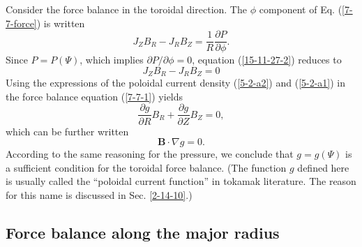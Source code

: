 \documentclass{llncs}
\begin{document}
Consider the force balance in the toroidal direction. The $\phi$ component of
Eq. (\ref{7-7-force}) is written
\begin{equation}
  \label{15-11-27-2} J_Z B_R - J_R B_Z = \frac{1}{R} \frac{\partial
  P}{\partial \phi} .
\end{equation}
Since $P = P (\Psi)$, which implies $\partial P / \partial \phi = 0$, equation
(\ref{15-11-27-2}) reduces to
\begin{equation}
  \label{7-7-1} J_Z B_R - J_R B_Z = 0
\end{equation}
Using the expressions of the poloidal current density (\ref{5-2-a2}) and
(\ref{5-2-a1}) in the force balance equation (\ref{7-7-1}) yields
\begin{equation}
  \label{7-8-fai} \frac{\partial g}{\partial R} B_R + \frac{\partial
  g}{\partial Z} B_Z = 0,
\end{equation}
which can be further written
\begin{equation}
  \label{9-7-1} \mathbf{B} \cdot \nabla g = 0.
\end{equation}
According to the same reasoning for the pressure, we conclude that $g = g
(\Psi)$ is a sufficient condition for the toroidal force balance. (The
function $g$ defined here is usually called the ``poloidal current function''
in tokamak literature. The reason for this name is discussed in Sec.
\ref{2-14-10}.)

\subsection{Force balance along the major radius}\label{24-11-11-2}
\end{document}
